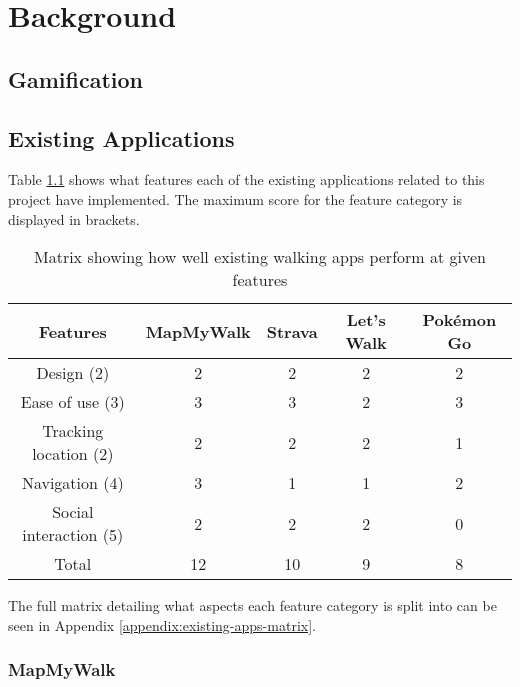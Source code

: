 \chapter{Background}

\section{Gamification}


\section{Existing Applications}


Table \ref{table:existing-walking-apps} shows what features each of the existing applications related to this project have implemented. The maximum score for the feature category is displayed in brackets.

\begin{table}[h]
  \centering
  \begin{tabular}{|c||c|c|c|c|}
    \hline
    Features & MapMyWalk & Strava & Let's Walk & Pok\'{e}mon Go\\
    \hline
    \hline
    Design (2) & 2 & 2 & 2 & 2\\
    \hline
    Ease of use (3) & 3 & 3 & 2 & 3\\
    \hline
    Tracking location (2) & 2 & 2 & 2 & 1\\
    \hline
    Navigation (4) & 3 & 1 & 1 & 2\\
    \hline
    Social interaction (5) & 2 & 2 & 2 & 0\\
    \hline
    \hline
    Total & 12 & 10 & 9 & 8\\
    \hline
  \end{tabular}
  \caption{Matrix showing how well existing walking apps perform at given features}
  \label{table:existing-walking-apps}
\end{table}

The full matrix detailing what aspects each feature category is split into can be seen in Appendix \ref{appendix:existing-apps-matrix}.


\subsection{MapMyWalk}

